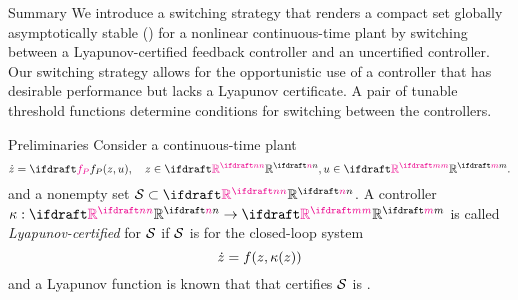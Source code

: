 \documentclass[final]{beamer}
\title{} %
\author{$^1$ (), $^1$, and $^2$} %
\institute{
    $^1$University of California, Santa Cruz; %
    $^2$University of California, Santa Barbara%
    } %
\newlength{\colspace}
\newlength{\colspaceouter}
\newlength{\onecolwid}
\begin{document}

\setlength{\belowcaptionskip}{2ex} %
\setlength\belowdisplayshortskip{2ex} %

\begin{frame}[t] %

\begin{columns}[t] %

\hspace{\colspaceouter} %

\begin{column}{\onecolwid} %


\begin{block}{Summary}
    We introduce a switching strategy that renders a compact set globally asymptotically stable (\UGAS) for a nonlinear continuous-time plant by switching between a Lyapunov-certified feedback controller and an uncertified controller. 
    Our switching strategy allows for the opportunistic use of a controller that has desirable performance but lacks a Lyapunov certificate.
    A pair of tunable threshold functions determine conditions for switching between the controllers.
\end{block}


\begin{block}{Preliminaries}
    Consider a continuous-time plant 
    \begin{equation}
        \dot z = \fp(z,u), \quad 
        z \in \plantstatespace, u \in  \plantinputspace.
        \label{eq:plant}
    \end{equation}
    and a nonempty set $\calS \subset \plantstatespace$.
    A controller ${\kappa : \plantstatespace \to \plantinputspace}$ is called \emph{Lyapunov-certified} for ${\mathcal{S}}$ if ${\mathcal{S}}$ is \UGAS for the closed-loop system 
    \begin{equation}
        \dot{z} = f(z, \kappa(z))
        \label{eq:closed-loop with kappa}
    \end{equation}
    and a Lyapunov function is known that that certifies ${\mathcal{S}}$ is \UGAS.
\end{block}


\end{column}
\end{columns}
\end{frame}
\end{document}
